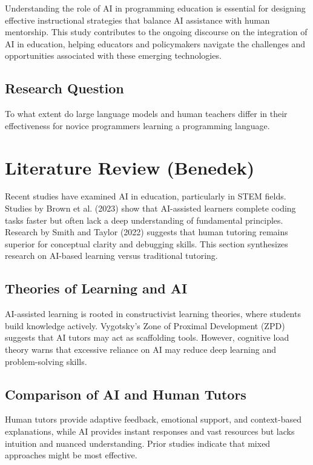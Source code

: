 \documentclass[12pt]{article}  %
\begin{document}
Understanding the role of AI in programming education is essential for designing effective instructional strategies that balance AI assistance with human mentorship. This study contributes to the ongoing discourse on the integration of AI in education, helping educators and policymakers navigate the challenges and opportunities associated with these emerging technologies.

\subsection{Research Question}

To what extent do large language models and human teachers differ in their effectiveness for novice programmers learning a programming language.

\section{Literature Review (Benedek)}

Recent studies have examined AI in education, particularly in STEM fields. Studies by Brown et al. (2023) show that AI-assisted learners complete coding tasks faster but often lack a deep understanding of fundamental principles. Research by Smith and Taylor (2022) suggests that human tutoring remains superior for conceptual clarity and debugging skills. This section synthesizes research on AI-based learning versus traditional tutoring.

\subsection{Theories of Learning and AI}
AI-assisted learning is rooted in constructivist learning theories, where students build knowledge actively. Vygotsky's Zone of Proximal Development (ZPD) suggests that AI tutors may act as scaffolding tools. However, cognitive load theory warns that excessive reliance on AI may reduce deep learning and problem-solving skills.

\subsection{Comparison of AI and Human Tutors}
Human tutors provide adaptive feedback, emotional support, and context-based explanations, while AI provides instant responses and vast resources but lacks intuition and nuanced understanding. Prior studies indicate that mixed approaches might be most effective.
\end{document}
